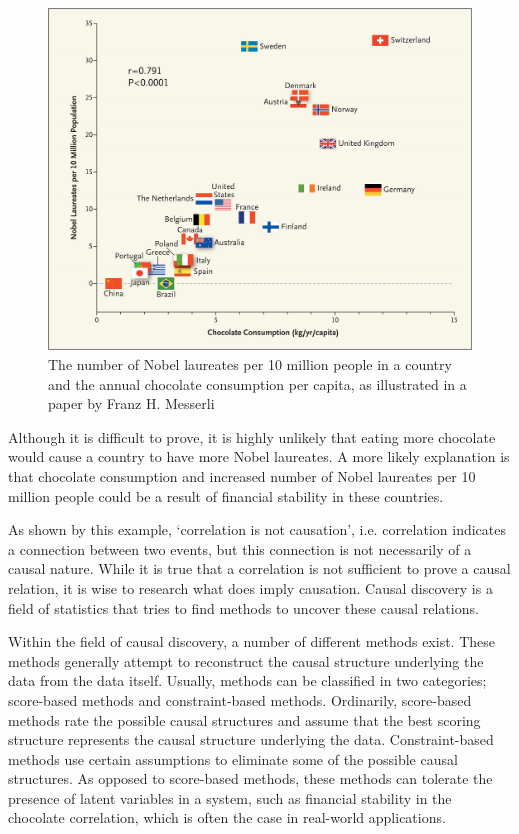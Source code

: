 \documentclass[a4paper,pdf]{article}
\begin{document}
\begin{figure}[!ht]
    \centering
    \includegraphics[width=\textwidth]{chocolate}
    \caption{The number of Nobel laureates per 10 million people in a country and the annual chocolate consumption per capita, as illustrated in a paper by Franz H. Messerli \cite[p.~1563]{nobelchocolate}}
    \label{fig:choc}
\end{figure}
Although it is difficult to prove, it is highly unlikely that eating more chocolate would cause a country to have more Nobel laureates. A more likely explanation is that chocolate consumption and increased number of Nobel laureates per 10 million people could be a result of financial stability in these countries. 

As shown by this example, `correlation is not causation', i.e. correlation indicates a connection between two events, but this connection is not necessarily of a causal nature. 
While it is true that a correlation is not sufficient to prove a causal relation, it is wise to research what does imply causation. Causal discovery \cite{Pearl2009inference,Spirtes2000} is a field of statistics that tries to find methods to uncover these causal relations.

Within the field of causal discovery, a number of different methods exist. These methods generally attempt to reconstruct the causal structure underlying the data from the data itself. 
Usually, methods can be classified in two categories; score-based methods and constraint-based methods. Ordinarily, score-based methods rate the possible causal structures and assume that the best scoring structure represents the causal structure underlying the data. Constraint-based methods use certain assumptions to eliminate some of the possible causal structures. As opposed to score-based methods, these methods can tolerate the presence of latent variables in a system, such as financial stability in the chocolate correlation, which is often the case in real-world applications.
\end{document}
